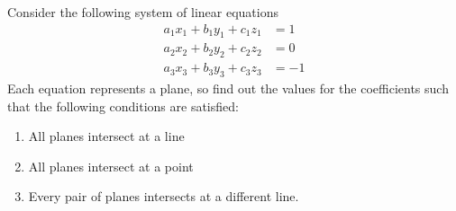 \documentclass[solution,addpoints,12pt]{exam}
\begin{document}
\begin{questions}



\question[1 \half] Consider the following system of linear equations 
\begin{align*}
    a_1x_1 + b_1y_1 + c_1z_1 & = 1\\
    a_2x_2 + b_2y_2 + c_2z_2 & = 0\\
    a_3x_3 + b_3y_3 + c_3z_3 & = -1
\end{align*}
Each equation represents a plane, so find out the values for the coefficients such that the following conditions are satisfied:\\
\begin{enumerate}
    \item All planes intersect at a line
    \item All planes intersect at a point
    \item Every pair of planes intersects at a different line.
\end{enumerate}
\begin{solution}

\end{solution}


\end{questions}
\end{document}

